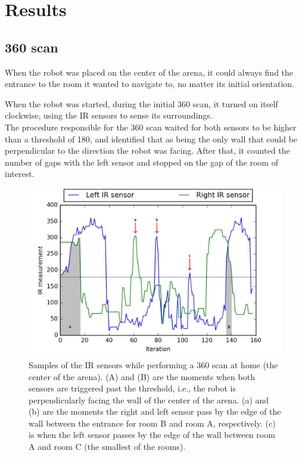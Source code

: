 \section{Results}

\subsection{360 scan}

When the robot was placed on the center of the arena, it could always find the entrance to the room it wanted to navigate to, no matter its initial orientation.

When the robot was started, during the initial 360 scan, it turned on itself clockwise, using the IR sensors to sense its surroundings.\\
The procedure responsible for the 360 scan waited for both sensors to be higher than a threshold of 180, and identified that as being the only wall that could be perpendicular to the direction the robot was facing. After that, it counted the number of gaps with the left sensor and stopped on the gap of the room of interest.

\begin{figure}[ht]
    \centering
    \includegraphics[width=0.7\linewidth]{res/360-scan-plot.png}
    \caption{Samples of the IR sensors while performing a 360 scan at home (the center of the arena). (A) and (B) are the moments when both sensors are triggered past the threshold, i.e., the robot is perpendicularly facing the wall of the center of the arena. (a) and (b) are the moments the right and left sensor pass by the edge of the wall between the entrance for room B and room A, respectively. (c) is when the left sensor passes by the edge of the wall between room A and room C (the smallest of the rooms).}
\end{figure}


\newpage
